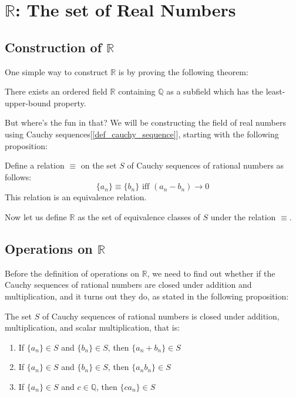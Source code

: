 \documentclass{report}
\begin{document}
	\section{$\mathbb{R}$: The set of Real Numbers}
		\subsection{Construction of $\mathbb{R}$}
			One simple way to construct $\mathbb{R}$ is by proving the following theorem:
			
			\begin{thm} \label{thm_existence_real_number}
				There exists an ordered field $\mathbb{R}$ containing $\mathbb{Q}$ as a subfield which has the least-upper-bound property.
			\end{thm}
		
			But where's the fun in that? We will be constructing the field of real numbers using Cauchy sequences[\ref{def_cauchy_sequence}], starting with the following proposition:
		
			\begin{thm}
				Define a relation $\equiv$ on the set $S$ of Cauchy sequences of rational numbers as follows:
				\begin{displaymath}
					\{a_n\} \equiv \{b_n\} \text{   iff   } (a_n-b_n)\rightarrow 0
				\end{displaymath}
				This relation is an equivalence relation.
			\end{thm}
		
			Now let us define $\mathbb{R}$ as the set of equivalence classes of $S$ under the relation $\equiv$.

		\subsection{Operations on $\mathbb{R}$}
		
			Before the definition of operations on $\mathbb{R}$, we need to find out whether if the Cauchy sequences of rational numbers are closed under addition and multiplication, and it turns out they do, as stated in the following proposition:
		
			\begin{prop}
				The set $S$ of Cauchy sequences of rational numbers is closed under addition, multiplication, and scalar multiplication, that is:
				\begin{enumerate}
					\item If $\{a_n\}\in S$ and $\{b_n\}\in S$, then $\{a_n+b_n\}\in S$
					\item If $\{a_n\}\in S$ and $\{b_n\}\in S$, then $\{a_nb_n\}\in S$
					\item If $\{a_n\}\in S$ and $c \in \mathbb{Q}$, then $\{ca_n\}\in S$
				\end{enumerate}
			\end{prop}
		
\end{document}
